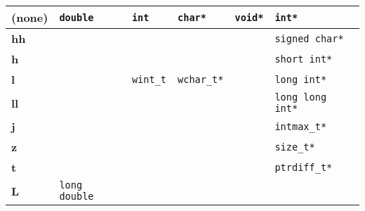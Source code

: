 \begin{center}
\vspace{0.2cm}

\tabletail{\hline}
\tablelasttail{\hline}
\footnotesize
{
\begin{xtabular}[!]{|C{.15\columnwidth}|C{.23\columnwidth}|C{.12\columnwidth}|C{.15\columnwidth}|C{.1\columnwidth}|C{.25\columnwidth}|}
\textbf{(none)} & \texttt{double}      & \texttt{int}    & \texttt{char*}    & \texttt{void*} & \texttt{int*}           \\ \hline    
\textbf{hh}     &                      &                 &                   &                & \texttt{signed char*}   \\ \hline            
\textbf{h}      &                      &                 &                   &                & \texttt{short int*}     \\ \hline          
\textbf{l}      &                      & \texttt{wint\_t} & \texttt{wchar\_t*} &                & \texttt{long int*}      \\ \hline         
\textbf{ll}     &                      &                 &                   &                & \texttt{long long int*} \\ \hline              
\textbf{j}      &                      &                 &                   &                & \texttt{intmax\_t*}      \\ \hline         
\textbf{z}      &                      &                 &                   &                & \texttt{size\_t*}        \\ \hline       
\textbf{t}      &                      &                 &                   &                & \texttt{ptrdiff\_t*}     \\ \hline          
\textbf{L}      & \texttt{long double} &                 &                   &                &                         \\
\end{xtabular}
}

\end{center}
